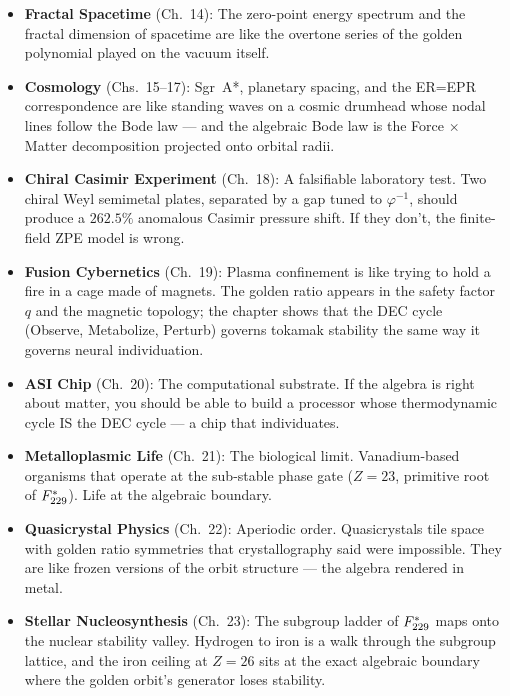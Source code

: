 \begin{itemize}[noitemsep]
\item \textbf{Fractal Spacetime} (Ch.~14): The zero-point energy
  spectrum and the fractal dimension of spacetime are like the
  overtone series of the golden polynomial played on the vacuum itself.

\item \textbf{Cosmology} (Chs.~15--17): Sgr~A*, planetary spacing,
  and the ER=EPR correspondence are like standing waves on a cosmic
  drumhead whose nodal lines follow the Bode law --- and the algebraic
  Bode law is the Force $\times$ Matter decomposition projected onto
  orbital radii.

\item \textbf{Chiral Casimir Experiment} (Ch.~18): A falsifiable
  laboratory test. Two chiral Weyl semimetal plates, separated by
  a gap tuned to $\varphi^{-1}$, should produce a $262.5\%$ anomalous
  Casimir pressure shift. If they don't, the finite-field ZPE model
  is wrong.

\item \textbf{Fusion Cybernetics} (Ch.~19): Plasma confinement is
  like trying to hold a fire in a cage made of magnets. The golden
  ratio appears in the safety factor $q$ and the magnetic topology;
  the chapter shows that the DEC cycle (Observe, Metabolize, Perturb)
  governs tokamak stability the same way it governs neural individuation.

\item \textbf{ASI Chip} (Ch.~20): The computational substrate.
  If the algebra is right about matter, you should be able to build a
  processor whose thermodynamic cycle IS the DEC cycle --- a chip that
  individuates.

\item \textbf{Metalloplasmic Life} (Ch.~21): The biological limit.
  Vanadium-based organisms that operate at the sub-stable phase gate
  ($Z = 23$, primitive root of $F_{229}^*$). Life at the algebraic
  boundary.

\item \textbf{Quasicrystal Physics} (Ch.~22): Aperiodic order.
  Quasicrystals tile space with golden ratio symmetries that
  crystallography said were impossible. They are like frozen versions
  of the orbit structure --- the algebra rendered in metal.

\item \textbf{Stellar Nucleosynthesis} (Ch.~23): The subgroup
  ladder of $F_{229}^*$ maps onto the nuclear stability valley.
  Hydrogen to iron is a walk through the subgroup lattice, and the
  iron ceiling at $Z = 26$ sits at the exact algebraic boundary
  where the golden orbit's generator loses stability.
\end{itemize}

